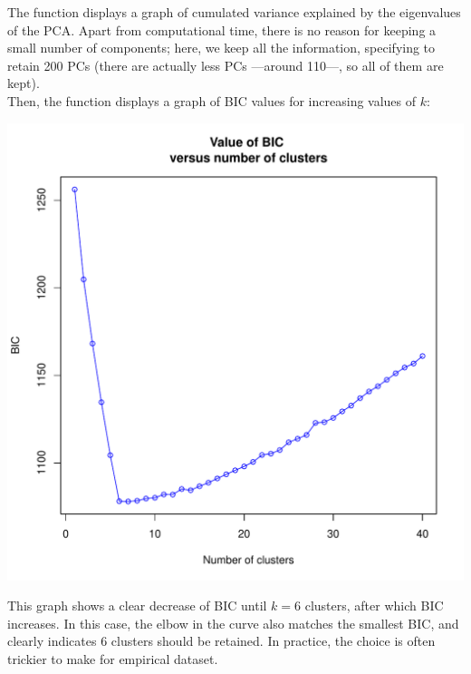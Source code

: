 \documentclass{article}
\begin{document}
\noindent
The function displays a graph of cumulated variance explained by the eigenvalues of the PCA.
Apart from computational time, there is no reason for keeping a small number of components; here, we
keep all the information, specifying to retain 200 PCs (there are actually less PCs ---around 110---, so all of them
are kept).
\\

Then, the function displays a graph of BIC values for increasing values of $k$:
\begin{center}
  \includegraphics[width=.7\textwidth]{findclust-bic.pdf}
\end{center}

\noindent This graph shows a clear decrease of BIC until $k=6$ clusters, after which BIC increases.
In this case, the elbow in the curve also matches the smallest BIC, and clearly indicates 6 clusters
should be retained. In practice, the choice is often trickier to make for empirical dataset.
\\
\end{document}
